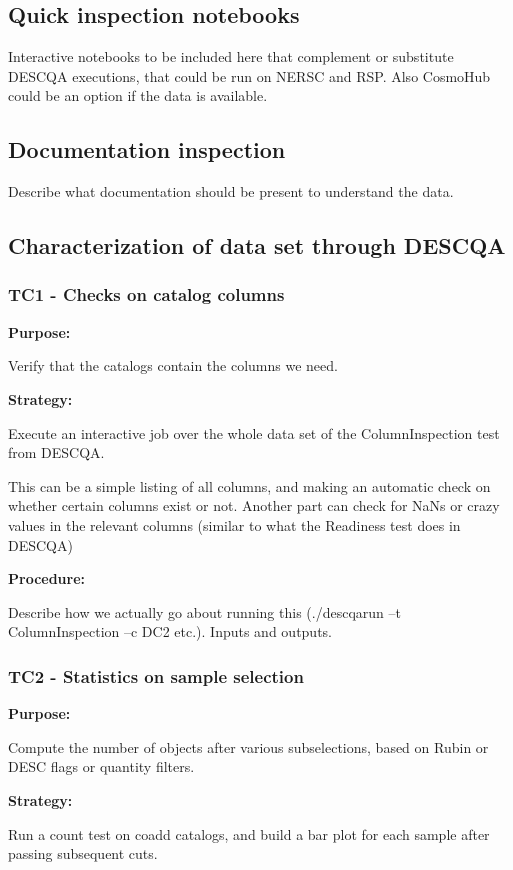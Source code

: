 \documentclass[12pt, a4paper]{article}
\begin{document}
\subsection{Quick inspection notebooks}
Interactive notebooks to be included here that complement or substitute DESCQA executions, that could be run on NERSC and RSP. Also CosmoHub could be an option if the data is available.

\subsection{Documentation inspection}
Describe what documentation should be present to understand the data.

\subsection{Characterization of data set through DESCQA}

\subsubsection{TC1 - Checks on catalog columns}
\textbf{Purpose:} 

Verify that the catalogs contain the columns we need.

\textbf{Strategy:} 

Execute an interactive job over the whole data set of the ColumnInspection test from DESCQA.

This can be a simple listing of all columns, and making an automatic check on whether certain columns exist or not. 
Another part can check for NaNs or crazy values in the relevant columns (similar to what the Readiness test does in DESCQA)

\textbf{Procedure:} 

Describe how we actually go about running this (./descqarun --t ColumnInspection --c DC2 etc.). Inputs and outputs.

\subsubsection{TC2 - Statistics on sample selection}
\textbf{Purpose:} 

Compute the number of objects after various subselections, based on Rubin or DESC flags or quantity filters.

\textbf{Strategy:} 

Run a count test on coadd catalogs, and build a bar plot for each sample after passing subsequent cuts.
\end{document}

